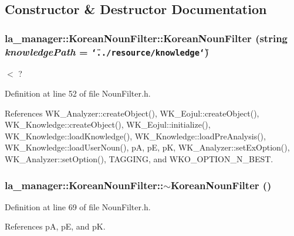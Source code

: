 \subsection{Constructor \& Destructor Documentation}
\hypertarget{classla__manager_1_1KoreanNounFilter_1d9ef25ee72814af339c023f0c348764}{
\subsubsection[{KoreanNounFilter}]{\setlength{\rightskip}{0pt plus 5cm}la\_\-manager::KoreanNounFilter::KoreanNounFilter (string {\em knowledgePath} = {\tt \char`\"{}../resource/knowledge\char`\"{}})}}
\label{classla__manager_1_1KoreanNounFilter_1d9ef25ee72814af339c023f0c348764}




$<$ ? 

Definition at line 52 of file NounFilter.h.

References WK\_\-Analyzer::createObject(), WK\_\-Eojul::createObject(), WK\_\-Knowledge::createObject(), WK\_\-Eojul::initialize(), WK\_\-Knowledge::loadKnowledge(), WK\_\-Knowledge::loadPreAnalysis(), WK\_\-Knowledge::loadUserNoun(), pA, pE, pK, WK\_\-Analyzer::setExOption(), WK\_\-Analyzer::setOption(), TAGGING, and WKO\_\-OPTION\_\-N\_\-BEST.\hypertarget{classla__manager_1_1KoreanNounFilter_87509e16fd32308b618876c9bde46be6}{
\subsubsection[{$\sim$KoreanNounFilter}]{\setlength{\rightskip}{0pt plus 5cm}la\_\-manager::KoreanNounFilter::$\sim$KoreanNounFilter ()}}
\label{classla__manager_1_1KoreanNounFilter_87509e16fd32308b618876c9bde46be6}




Definition at line 69 of file NounFilter.h.

References pA, pE, and pK.

